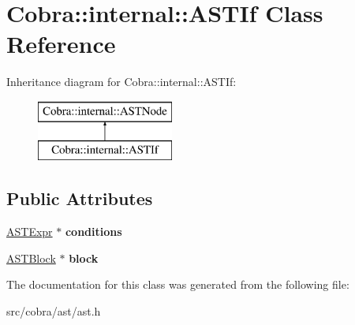 \hypertarget{class_cobra_1_1internal_1_1_a_s_t_if}{\section{Cobra\+:\+:internal\+:\+:A\+S\+T\+If Class Reference}
\label{class_cobra_1_1internal_1_1_a_s_t_if}
}
Inheritance diagram for Cobra\+:\+:internal\+:\+:A\+S\+T\+If\+:\begin{figure}[H]
\begin{center}
\leavevmode
\includegraphics[height=2.000000cm]{class_cobra_1_1internal_1_1_a_s_t_if}
\end{center}
\end{figure}
\subsection*{Public Attributes}
\begin{DoxyCompactItemize}
\item 
\hypertarget{class_cobra_1_1internal_1_1_a_s_t_if_a8131dd336fcda4d14ee7f6ed6e1a4807}{\hyperlink{class_cobra_1_1internal_1_1_a_s_t_expr}{A\+S\+T\+Expr} $\ast$ {\bfseries conditions}}\label{class_cobra_1_1internal_1_1_a_s_t_if_a8131dd336fcda4d14ee7f6ed6e1a4807}

\item 
\hypertarget{class_cobra_1_1internal_1_1_a_s_t_if_a487d09082eab4efc05cb3415987fc0b9}{\hyperlink{class_cobra_1_1internal_1_1_a_s_t_block}{A\+S\+T\+Block} $\ast$ {\bfseries block}}\label{class_cobra_1_1internal_1_1_a_s_t_if_a487d09082eab4efc05cb3415987fc0b9}

\end{DoxyCompactItemize}


The documentation for this class was generated from the following file\+:\begin{DoxyCompactItemize}
\item 
src/cobra/ast/ast.\+h\end{DoxyCompactItemize}
